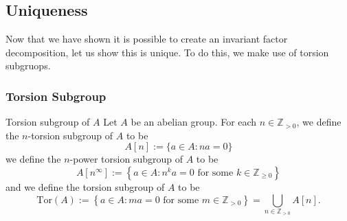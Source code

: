 \documentclass{article}
\begin{document}
\subsection{Uniqueness}
Now that we have shown it is possible to create an invariant factor decomposition, let us show this is unique. To do this, we make use of torsion subgruops.
\subsubsection{Torsion Subgroup}
\begin{definition}{Torsion subgroup of $A$}
    Let $A$ be an abelian group. For each $n\in \mathbb{Z}_{>0}$, we define the $n$-torsion subgroup of $A$ to be
    \begin{equation*}
        A[n] := \{a\in A: na = 0\}
    \end{equation*}
    we define the $n$-power torsion subgroup of $A$ to be
    \begin{equation*}
        A[n^\infty] := \left\{a\in A: n^k a = 0 \text{ for some } k \in \mathbb{Z}_{\ge 0}\right\}
    \end{equation*}
    and we define the torsion subgroup of $A$ to be 
    \begin{equation*}
        \text{Tor}(A) := \left\{a\in A: ma=0 \text{ for some } m\in \mathbb{Z}_{>0}\right\} = \bigcup_{n\in \mathbb{Z}_{>0}}A[n].
    \end{equation*}
\end{definition}
\end{document}
